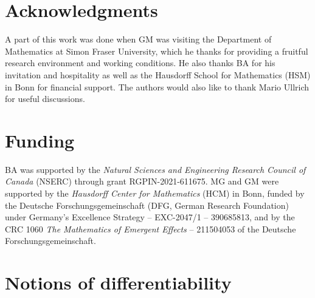 \documentclass[namedate,webpdf]{ima-authoring-template-blank}
\numberwithin{counter}{section}
\numberwithin{equation}{section}
\theoremstyle{plain}
\theoremstyle{definition}
\theoremstyle{thmstyletwo}
\begin{document}

\section*{Acknowledgments}

A part of this work was done when GM was visiting the Department of Mathematics at Simon Fraser University, which he thanks for providing a fruitful research environment and working conditions. He also thanks BA for his invitation and hospitality as well as the Hausdorff School for Mathematics (HSM) in Bonn for financial support. The authors would also like to thank Mario Ullrich for useful discussions.

\section*{Funding}
BA was supported by the \emph{Natural Sciences and Engineering Research Council of Canada} (NSERC) through grant RGPIN-2021-611675. MG and GM were supported by the \emph{Hausdorff Center for Mathematics} (HCM) in Bonn, funded by the Deutsche Forschungsgemeinschaft (DFG, German Research Foundation) under Germany’s Excellence Strategy -- EXC-2047/1 -- 390685813, and by the CRC 1060 \emph{The Mathematics of Emergent Effects} -- 211504053 of the Deutsche Forschungsgemeinschaft.
















\appendix
\renewcommand\theHsection{appendix.\Alph{section}}

\section{Notions of differentiability}
\label{sec: app: Notions of differentiability}
\end{document}
